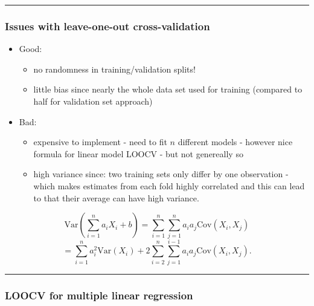 \documentclass[]{article}
\providecommand{\tightlist}{%
  \setlength{\itemsep}{0pt}\setlength{\parskip}{0pt}}
\begin{document}
\normalsize

\begin{center}\rule{0.5\linewidth}{\linethickness}\end{center}

\hypertarget{issues-with-leave-one-out-cross-validation}{%
\subsubsection{Issues with leave-one-out
cross-validation}\label{issues-with-leave-one-out-cross-validation}}

\begin{itemize}
\tightlist
\item
  Good:

  \begin{itemize}
  \tightlist
  \item
    no randomness in training/validation splits!
  \item
    little bias since nearly the whole data set used for training
    (compared to half for validation set approach)
  \end{itemize}
\item
  Bad:

  \begin{itemize}
  \tightlist
  \item
    expensive to implement - need to fit \(n\) different models -
    however nice formula for linear model LOOCV - but not genereally so
  \item
    high variance since: two training sets only differ by one
    observation - which makes estimates from each fold highly correlated
    and this can lead to that their average can have high variance.
  \end{itemize}
\end{itemize}

\[\text{Var}(\sum_{i=1}^na_iX_i+b)=\sum_{i=1}^n\sum_{j=1}^n a_ia_j\text{Cov}(X_i,X_j)\]
\[=\sum_{i=1}^na_i^2\text{Var}(X_i)+2\sum_{i=2}^n \sum_{j=1}^{i-1}
a_ia_j\text{Cov}(X_i,X_j).\]

\begin{center}\rule{0.5\linewidth}{\linethickness}\end{center}

\hypertarget{loocv-for-multiple-linear-regression}{%
\subsubsection{LOOCV for multiple linear
regression}\label{loocv-for-multiple-linear-regression}}
\end{document}
